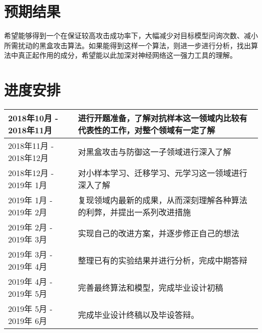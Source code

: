 \vspace{\baselineskip}
{\let\clearpage\relax \chapter{预期结果}}

希望能够得到一个在保证较高攻击成功率下，大幅减少对目标模型问询次数、减小所需扰动的黑盒攻击算法。如果能得到这样一个算法，则进一步进行分析，找出算法中真正起作用的成分，希望能以此加深对神经网络这一强力工具的理解。


\vspace{\baselineskip}
{\let\clearpage\relax \chapter{进度安排}}
\begin{center}
	\begin{tabular}{| m{} | m{}|}
	\hline
	2018年10月 - 2018年11月 & 进行开题准备，了解对抗样本这一领域内比较有代表性的工作，对整个领域有一定了解 \\
	\hline
	2018年11月 - 2018年12月 & 对黑盒攻击与防御这一子领域进行深入了解 \\
	\hline
	2018年12月 - 2019年 1月 & 对小样本学习、迁移学习、元学习这一领域进行深入了解 \\
	\hline
	2019年 1月 - 2019年 2月 & 复现领域内最新的成果，从而深刻理解各种算法的利弊，并提出一系列改进措施 \\
	\hline
	2019年 2月 - 2019年 3月 & 实现自己的改进方案，并逐步修正自己的想法 \\
	\hline 
	2019年 3月 - 2019年 4月 & 整理已有的实验结果并进行分析，完成中期答辩 \\
	\hline 
	2019年 4月 - 2019年 5月 & 完善最终算法和模型，完成毕业设计初稿 \\
	\hline
	2019年 5月 - 2019年 6月 & 完成毕业设计终稿以及毕设答辩。 \\
	\hline
	\end{tabular}
\end{center}